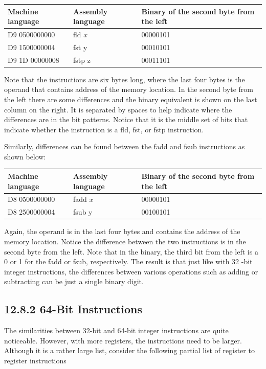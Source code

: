 \documentclass[10pt]{article}
\begin{document}
\begin{center}
\begin{tabular}{|l|l|l|}
\hline
Machine language & Assembly language & Binary of the second byte from the left \\
\hline
D9 0500000000 & fld $x$ & 00000101 \\
\hline
D9 1500000004 & fst y & 00010101 \\
\hline
D9 1D 00000008 & fstp z & 00011101 \\
\hline
\end{tabular}
\end{center}

Note that the instructions are six bytes long, where the last four bytes is the operand that contains address of the memory location. In the second byte from the left there are some differences and the binary equivalent is shown on the last column on the right. It is separated by spaces to help indicate where the differences are in the bit patterns. Notice that it is the middle set of bits that indicate whether the instruction is a fld, fst, or fstp instruction.

Similarly, differences can be found between the fadd and fsub instructions as shown below:

\begin{center}
\begin{tabular}{|l|l|l|}
\hline
Machine language & Assembly language & Binary of the second byte from the left \\
\hline
D8 0500000000 & fadd $x$ & 00000101 \\
\hline
D8 2500000004 & fsub y & 00100101 \\
\hline
\end{tabular}
\end{center}

Again, the operand is in the last four bytes and contains the address of the memory location. Notice the difference between the two instructions is in the second byte from the left. Note that in the binary, the third bit from the left is a 0 or 1 for the fadd or fsub, respectively. The result is that just like with 32 -bit integer instructions, the differences between various operations such as adding or subtracting can be just a single binary digit.

\subsection*{12.8.2 64-Bit Instructions}
The similarities between 32-bit and 64-bit integer instructions are quite noticeable. However, with more registers, the instructions need to be larger. Although it is a rather large list, consider the following partial list of register to register instructions
\end{document}
